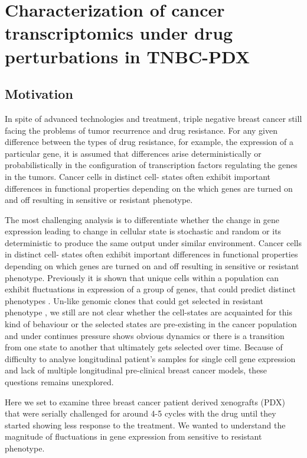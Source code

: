 
{\chapter{Characterization of cancer transcriptomics under drug perturbations in TNBC-PDX}

}
 \label{ch:Chapter5}
 \section{Motivation}

In spite of advanced technologies and treatment, triple negative breast cancer still facing the problems of tumor recurrence and drug resistance.
For any given difference between the types of drug resistance, for example, the expression of a particular gene, it is assumed that differences arise deterministically or probabilistically in the configuration of transcription factors regulating the genes in the tumors. Cancer cells in distinct cell- states often exhibit important differences in functional properties depending on the which genes are turned on and off resulting in sensitive or resistant phenotype.

The most challenging analysis is to differentiate whether the change in gene expression leading to change in cellular state is stochastic\cite{raj2008nature} and random or its deterministic to produce the same output under similar environment.
Cancer cells in distinct cell- states often exhibit important differences in functional properties depending on which genes are turned on and off resulting in sensitive  or resistant phenotype.
Previously it is shown that unique cells within a population can exhibit fluctuations in expression of a group of genes, that could predict distinct phenotypes \cite{shaffer2019memory}.
Un-like genomic clones that could get selected in resistant phenotype \cite{salehi2020single}, we still are not clear whether the cell-states are acquainted for this kind of behaviour or the selected states are pre-existing in the cancer population and under continues pressure shows obvious dynamics or there is a transition from one state to another that ultimately gets selected over time. Because of difficulty to analyse longitudinal patient's samples for single cell gene expression and lack of multiple longitudinal pre-clinical breast cancer models, these questions remains unexplored.

Here we set to examine three breast cancer patient derived xenografts (PDX) that were serially challenged for around 4-5 cycles with the drug until they started showing less response to the treatment. We wanted to understand the magnitude of fluctuations in gene expression from sensitive to resistant phenotype.


